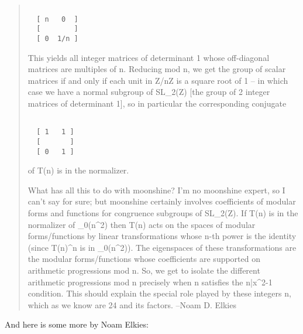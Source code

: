 \begin{quote}
\begin{verbatim}

  [ n   0  ]
  [        ]
  [ 0  1/n ]
\end{verbatim}
    
This yields all integer matrices of determinant 1 whose off-diagonal
matrices are multiples of n.  Reducing mod n, we get the group of
scalar matrices if and only if each unit in Z/nZ is a square root of 1
-- in which case we have a normal subgroup of 
SL_{2}(Z) [the group of 2
integer matrices of determinant 1], so in particular the corresponding
conjugate

\begin{verbatim}

  [ 1   1 ]
  [       ]
  [ 0   1 ]
\end{verbatim}
    
of T(n) is in the normalizer.

What has all this to do with moonshine?  I'm no moonshine expert, so I
can't say for sure; but moonshine certainly involves coefficients of
modular forms and functions for congruence subgroups of
SL_{2}(Z).  If T(n) is in the normalizer of
\Gamma _{0}(n^{2}) then T(n) acts on the spaces of modular
forms/functions by linear transformations whose n-th power is the
identity (since T(n)^{n} is in
\Gamma _{0}(n^{2})).  The eigenspaces of these
transformations are the modular forms/functions whose coefficients are
supported on arithmetic progressions mod n.  So, we get to isolate the
different arithmetic progressions mod n precisely when n satisfies the
n|x^{2}-1 condition.  This should explain the special role
played by these integers n, which as we know are 24 and its factors.
--Noam D. Elkies 
\end{quote}
And here is some more by Noam Elkies:
